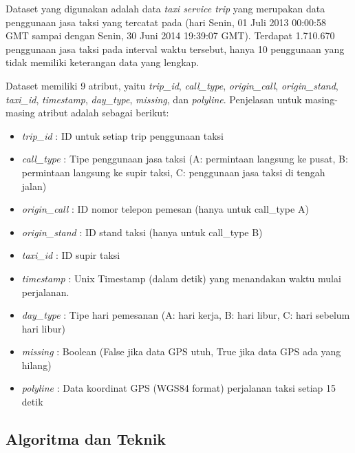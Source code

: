 \documentclass{article}
\begin{document}
\begin{adjustwidth}{2em}{0pt}

\hspace{\parindent}Dataset yang digunakan adalah data \textit{taxi service trip} yang merupakan data penggunaan jasa taksi yang tercatat pada (hari Senin, 01 Juli 2013 00:00:58 GMT sampai dengan Senin, 30 Juni 2014 19:39:07 GMT). Terdapat 1.710.670 penggunaan jasa taksi pada interval waktu tersebut, hanya 10 penggunaan yang tidak memiliki keterangan data yang lengkap.

Dataset memiliki 9 atribut, yaitu \textit{trip\_id}, \textit{call\_type}, \textit{origin\_call}, \textit{origin\_stand}, \textit{taxi\_id}, \textit{timestamp}, \textit{day\_type}, \textit{missing}, dan \textit{polyline}. Penjelasan untuk masing-masing atribut adalah sebagai berikut:

\begin{itemize}
\item{\textit{trip\_id} : ID untuk setiap trip penggunaan taksi}
\item{\textit{call\_type} : Tipe penggunaan jasa taksi (A: permintaan langsung ke pusat, B: permintaan langsung ke supir taksi, C: penggunaan jasa taksi di tengah jalan)}
\item{\textit{origin\_call} : ID nomor telepon pemesan (hanya untuk call\_type A)}
\item{\textit{origin\_stand} : ID stand taksi (hanya untuk call\_type B)}
\item{\textit{taxi\_id} : ID supir taksi}
\item{\textit{timestamp} : Unix Timestamp (dalam detik) yang menandakan waktu mulai perjalanan.}
\item{\textit{day\_type} :  Tipe hari pemesanan (A: hari kerja, B: hari libur, C: hari sebelum hari libur)}
\item{\textit{missing} : Boolean (False jika data GPS utuh, True jika data GPS ada yang hilang)}
\item{\textit{polyline} : Data koordinat GPS (WGS84 format) perjalanan taksi setiap 15 detik}
\end{itemize}

\end{adjustwidth}

\subsection{Algoritma dan Teknik}
\end{document}
